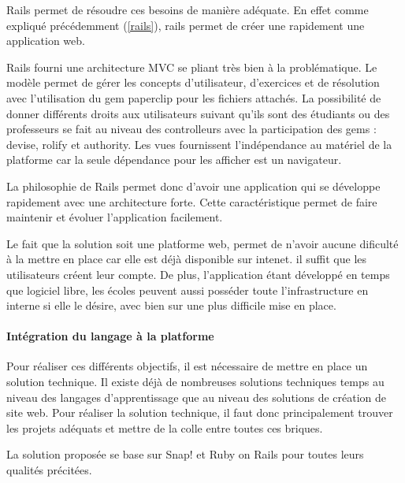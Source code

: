 Rails permet de résoudre ces besoins de manière adéquate. En effet comme expliqué précédemment (\ref{rails}), rails permet de créer une rapidement une application web.

Rails fourni une architecture MVC se pliant très bien à la problématique. Le modèle permet de gérer les concepts d'utilisateur, d'exercices et de résolution avec l'utilisation du gem paperclip pour les fichiers attachés.  La possibilité de donner différents droits aux utilisateurs suivant qu'ils sont des étudiants ou des professeurs se fait au niveau des controlleurs avec la participation des gems : devise, rolify et authority. Les vues fournissent l'indépendance au matériel de la platforme car la seule dépendance pour les afficher est un navigateur.

La philosophie de Rails permet donc d'avoir une application qui se développe rapidement avec une architecture forte. Cette caractéristique permet de faire maintenir et évoluer l'application facilement.

Le fait que la solution soit une platforme web, permet de n'avoir aucune dificulté à la mettre en place car elle est déjà disponible sur intenet. il suffit que les utilisateurs créent leur compte. De plus, l'application étant développé en temps que logiciel libre, les écoles peuvent aussi posséder toute l'infrastructure en interne si elle le désire, avec bien sur une plus difficile mise en place.

\paragraph{Intégration du langage à la platforme}

Pour réaliser ces différents objectifs, il est nécessaire de mettre en place un solution technique. Il existe déjà de nombreuses solutions techniques temps au niveau des langages d'apprentissage que au niveau des solutions de création de site web. Pour réaliser la solution technique, il faut donc principalement trouver les projets adéquats et mettre de la colle entre toutes ces briques.

La solution proposée se base sur Snap! et Ruby on Rails pour toutes leurs qualités précitées. 
